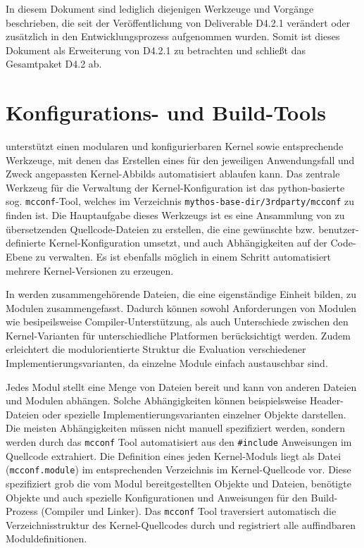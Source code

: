 In diesem Dokument sind lediglich diejenigen Werkzeuge und Vorgänge beschrieben,
die seit der Veröffentlichung von Deliverable D4.2.1 verändert oder zusätzlich in den
Entwicklungsprozess aufgenommen wurden. Somit ist dieses Dokument als
Erweiterung von D4.2.1 zu betrachten und schließt das Gesamtpaket D4.2 ab.

\section{Konfigurations- und Build-Tools}

\mythos unterstützt einen modularen und konfigurierbaren Kernel sowie
entsprechende Werkzeuge, mit denen das Erstellen eines für den jeweiligen
Anwendungsfall und Zweck angepassten Kernel-Abbilds automatisiert ablaufen kann.
Das zentrale Werkzeug für die Verwaltung der Kernel-Konfiguration ist das
python-basierte sog. \texttt{mcconf}-Tool, welches im Verzeichnis
\texttt{{mythos-base-dir}/3rdparty/mcconf} zu finden ist. Die Hauptaufgabe
dieses Werkzeugs ist es eine Ansammlung von zu übersetzenden Quellcode-Dateien
zu erstellen, die eine gewünschte bzw. benutzer-definierte Kernel-Konfiguration
umsetzt, und auch Abhängigkeiten auf der Code-Ebene zu verwalten. Es ist
ebenfalls möglich in einem Schritt automatisiert mehrere Kernel-Versionen zu
erzeugen. 

In \mythos werden zusammengehörende Dateien, die eine eigenständige Einheit
bilden, zu Modulen zusammengefasst. Dadurch können sowohl Anforderungen von
Modulen wie besipeilsweise Compiler-Unterstützung, als auch Unterschiede
zwischen den Kernel-Varianten für unterschiedliche Platformen berücksichtigt
werden. Zudem erleichtert die modulorientierte Struktur die Evaluation
verschiedener Implementierungsvarianten, da einzelne Module einfach austauschbar
sind.

Jedes Modul stellt eine Menge von Dateien bereit und kann von anderen Dateien
und Modulen abhängen. Solche Abhängigkeiten können beispielsweise Header-Dateien
oder spezielle Implementierungsvarianten einzelner Objekte darstellen. Die
meisten Abhängigkeiten müssen nicht manuell spezifiziert werden, sondern werden
durch das \texttt{mcconf} Tool automatisiert aus den \texttt{\#include}
Anweisungen im Quellcode extrahiert. Die Definition eines jeden Kernel-Moduls
liegt als Datei (\texttt{mcconf.module}) im entsprechenden Verzeichnis im
Kernel-Quellcode vor. Diese spezifiziert grob die vom Modul bereitgestellten
Objekte und Dateien, benötigte Objekte und auch spezielle Konfigurationen und
Anweisungen für den Build-Prozess (Compiler und Linker). Das \texttt{mcconf}
Tool traversiert automatisch die Verzeichnisstruktur des Kernel-Quellcodes durch
und registriert alle auffindbaren Moduldefinitionen.

